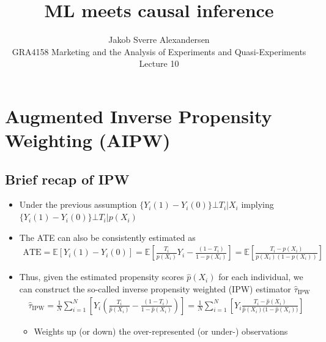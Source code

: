 \documentclass[10pt]{article}
\begin{document}
 
\title{ML meets causal inference}
\author{Jakob Sverre Alexandersen\\
GRA4158 Marketing and the Analysis of Experiments and Quasi-Experiments\\
Lecture 10}
\maketitle

\tableofcontents
\newpage
\section{Augmented Inverse Propensity Weighting (AIPW)}
\subsection{Brief recap of IPW}
\begin{itemize}
    \item Under the previous assumption $\{Y_i(1) - Y_i(0)\}\bot T_i|X_i $ implying $\{Y_i(1) - Y_i(0)\}\bot T_i|p(X_i) $
    \item The ATE can also be consistently estimated as 
    \begin{gather*}
        \text{ATE} = \mathbb{E}[Y_i(1) - Y_i(0)] = \mathbb{E}\left[\frac{T_i}{p(X_i)}Y_i - \frac{(1 - T_i)}{1 - p(X_i)}\right] = \mathbb{E}\left[\frac{T_i - p(X_i)}{p(X_i)(1 - p(X_i))}\right]
    \end{gather*}
    \item Thus, given the estimated propensity scores $\hat{p}(X_i) $ for each individual, we can construct the so-called inverse propensity weighted (IPW) estimator $\hat{\tau}_\text{IPW} $
    \begin{gather*}
        \hat{\tau}_\text{IPW} = \frac{1}{N}\sum_{i = 1}^{N}\left[Y_i\left(\frac{T_i}{\hat{p}(X_i)} - \frac{(1 - T_i)}{1 - \hat{p}(X_i)}\right)\right] = \frac{1}{N}\sum_{i = 1}^{N}\left[Y_i \frac{T_i - \hat{p}(X_i)}{\hat{p}(X_i)\big(1 - \hat{p}(X_i)\big)}\right]
    \end{gather*}
    \begin{itemize}
        \item Weights up (or down) the over-represented (or under-) observations
    \end{itemize}
\end{itemize}
\end{document}
